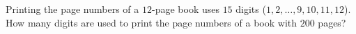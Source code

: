 Printing the page numbers of a $12$-page book uses $15$ digits ($1,2,\dots,9,10,11,12$). How many digits are used to print the page numbers of a book with $200$ pages?
